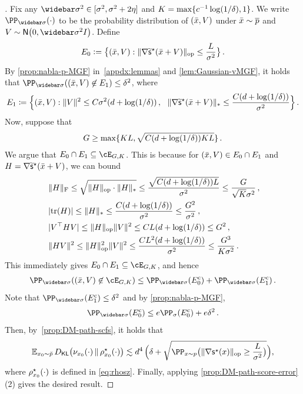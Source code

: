 \begin{proof}[]
Fix any $\sigbar^2\in [\sigma^2,\sigma^2+2\eta]$ and $K=\max\crl{c^{-1}\log(1/\delta),1}$. We write $\PP_{\sigbar}(\cdot)$ to be the probability distribution of $(\xbar,V)$ under $\xbar\sim \pbar$ and $V\sim \normal{0,\sigbar^2\Id}$. 
Define
\begin{align*}
    E_0\ldef \crl[\big]{(\xbar,V): \nrmop{\nabla \tscfs(\xbar+V)}\leq \frac{L}{\sigma^2}}\,.
\end{align*}
By \cref{prop:nabla-p-MGF} in~\cref{appdx:lemmas} and \cref{lem:Gaussian-vMGF}, it holds that $\PP_{\sigbar}((\xbar,V)\not \in E_1)\leq \delta^2$, where
\begin{align*}
    E_1\deq \crl[\Big]{(\xbar, V): \nrm{V}^2\leq C\sigma^2(d+\log(1/\delta))\,, ~~\nrmnuc{\nabla \tscfs(\xbar+V)}\leq \frac{C(d+\log(1/\delta))}{\sigma^2}}\,.
\end{align*}
Now, suppose that
\begin{align*}
    G\geq \max\crl{KL, \sqrt{C(d+\log(1/\delta))KL}}\,.
\end{align*}
We argue that $E_0\cap E_1\subseteq \cE_{G,K}$. This is because for $(\xbar,V)\in E_0\cap E_1$ and $H=\nabla \tscfs(\xbar+V)$, we can bound
\begin{align*}
    &~\nrmF{H}\leq\sqrt{\nrmop{H}\cdot \nrmnuc{H} } \leq \frac{\sqrt{C(d+\log(1/\delta))L}}{\sigma^2}\leq \frac{G}{\sqrt{K}\sigma^2}\,, \\
    &~\abs{\tr(H)}\leq \nrmnuc{H}\leq \frac{C(d+\log(1/\delta))}{\sigma^2}\leq \frac{G^2}{\sigma^2}\,, \\
    &~ \abs{V\tp H V} \leq \nrmop{H}\nrm{V}^2 \leq CL(d+\log(1/\delta))\leq G^2\,, \\
    &~ \nrm{HV}^2\leq \nrmop{H}^2\nrm{V}^2\leq \frac{CL^2(d+\log(1/\delta))}{\sigma^2}\leq \frac{G^3}{K\sigma^2}\,.
\end{align*}
This immediately gives $E_0\cap E_1\subseteq \cE_{G,K}$, and hence
\begin{align*}
    \PP_{\sigbar}\prn*{(\xbar,V)\not\in \cE_{G,K}}
    \leq \PP_{\sigbar}(E_0^\comp)+\PP_{\sigbar}(E_1^\comp)\,.
\end{align*}
Note that $\PP_{\sigbar}(E_1^\comp)\leq \delta^2$ and by \cref{prop:nabla-p-MGF}, 
\begin{align*}
    \PP_{\sigbar}( E_0^\comp)
    \leq e\PP_{\sigma}(E_0^\comp)+e\delta^2\,.
\end{align*}
Then, by~\cref{prop:DM-path-scfs}, it holds that
\begin{align*}
\En_{\xz\sim \breve p} \Dkl{\piz{\cdot}}{\rhosz{\cdot}}
\leqsim d^4\,\prn[\Big]{ \delta+\sqrt{\PP_{x\sim p}\prn[\big]{\nrmop{\nabla \scfs(x)}\geq \frac{L}{\sigma^2}}} },
\end{align*}
where $\rhosz{\cdot}$ is defined in \cref{eq:rhosz}. Finally, applying \cref{prop:DM-path-score-error} (2) gives the desired result.
\end{proof}

